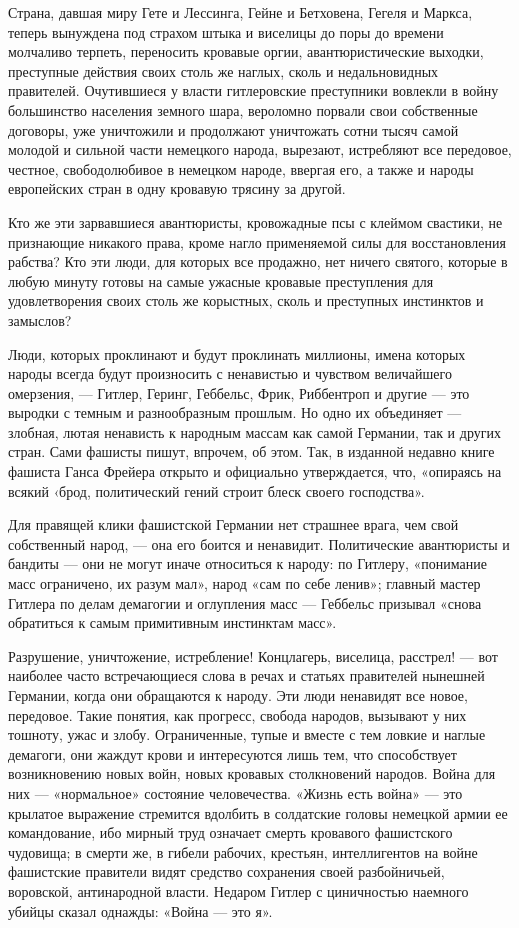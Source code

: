 \documentclass[12pt, a4paper, openany]{book}
\begin{document}
Страна, давшая миру Гете и Лессинга, Гейне и Бетховена, Гегеля и Маркса, теперь вынуждена под страхом штыка и виселицы до поры до времени молчаливо терпеть, переносить кровавые оргии, авантюристические выходки, преступные действия своих столь же наглых, сколь и недальновидных правителей. Очутившиеся у власти гитлеровские преступники вовлекли в войну большинство населения земного шара, вероломно порвали свои собственные договоры, уже уничтожили и продолжают уничтожать сотни тысяч самой молодой и сильной части немецкого народа, вырезают, истребляют все передовое, честное, свободолюбивое в немецком народе, ввергая его, а также и народы европейских стран в одну кровавую трясину за другой.

Кто же эти зарвавшиеся авантюристы, кровожадные псы с клеймом свастики, не признающие никакого права, кроме нагло применяемой силы для восстановления рабства? Кто эти люди, для которых все продажно, нет ничего святого, которые в любую минуту готовы на самые ужасные кровавые преступления для удовлетворения своих столь же корыстных, сколь и преступных инстинктов и замыслов?

Люди, которых проклинают и будут проклинать миллионы, имена которых народы всегда будут произносить с ненавистью и чувством величайшего омерзения, — Гитлер, Геринг, Геббельс, Фрик, Риббентроп и другие — это выродки с темным и разнообразным прошлым. Но одно их объединяет — злобная, лютая ненависть к народным массам как самой Германии, так и других стран. Сами фашисты пишут, впрочем, об этом. Так, в изданной недавно книге фашиста Ганса Фрейера открыто и официально утверждается, что, «опираясь на всякий ‹брод, политический гений строит блеск своего господства».

Для правящей клики фашистской Германии нет страшнее врага, чем свой собственный народ, — она его боится и ненавидит. Политические авантюристы и бандиты — они не могут иначе относиться к народу: по Гитлеру, «понимание масс ограничено, их разум мал», народ «сам по себе ленив»; главный мастер Гитлера по делам демагогии и оглупления масс — Геббельс призывал «снова обратиться к самым примитивным инстинктам масс».

Разрушение, уничтожение, истребление! Концлагерь, виселица, расстрел! — вот наиболее часто встречающиеся слова в речах и статьях правителей нынешней Германии, когда они обращаются к народу. Эти люди ненавидят все новое, передовое. Такие понятия, как прогресс, свобода народов, вызывают у них тошноту, ужас и злобу. Ограниченные, тупые и вместе с тем ловкие и наглые демагоги, они жаждут крови и интересуются лишь тем, что способствует возникновению новых войн, новых кровавых столкновений народов. Война для них — «нормальное» состояние человечества. «Жизнь есть война» — это крылатое выражение стремится вдолбить в солдатские головы немецкой армии ее командование, ибо мирный труд означает смерть кровавого фашистского чудовища; в смерти же, в гибели рабочих, крестьян, интеллигентов на войне фашистские правители видят средство сохранения своей разбойничьей, воровской, антинародной власти. Недаром Гитлер с циничностью наемного убийцы сказал однажды: «Война — это я».
\end{document}

